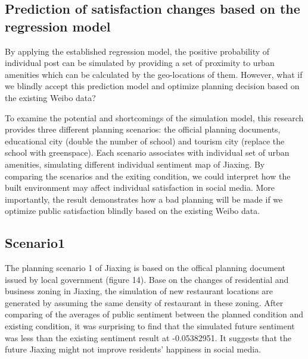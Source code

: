 \documentclass[
]{article}
\begin{document}
\hypertarget{prediction-of-satisfaction-changes-based-on-the-regression-model}{%
\subsection{Prediction of satisfaction changes based on the regression
model}\label{prediction-of-satisfaction-changes-based-on-the-regression-model}}

By applying the established regression model, the positive probability
of individual post can be simulated by providing a set of proximity to
urban amenities which can be calculated by the geo-locations of them.
However, what if we blindly accept this prediction model and optimize
planning decision based on the existing Weibo data?

To examine the potential and shortcomings of the simulation model, this
research provides three different planning scenarios: the official
planning documents, educational city (double the number of school) and
tourism city (replace the school with greenspace). Each scenario
associates with individual set of urban amenities, simulating different
individual sentiment map of Jiaxing. By comparing the scenarios and the
exiting condition, we could interpret how the built environment may
affect individual satisfaction in social media. More importantly, the
result demonstrates how a bad planning will be made if we optimize
public satisfaction blindly based on the existing Weibo data.

\hypertarget{scenario1}{%
\subsection{Scenario1}\label{scenario1}}

The planning scenario 1 of Jiaxing is based on the offical planning
document issued by local government (figure 14). Base on the changes of
residential and business zoning in Jiaxing, the simulation of new
restaurant locations are generated by assuming the same density of
restaurant in these zoning. After comparing of the averages of public
sentiment between the planned condition and existing condition, it was
surprising to find that the simulated future sentiment was less than the
existing sentiment result at -0.05382951. It suggests that the future
Jiaxing might not improve residents' happiness in social media.
\end{document}
